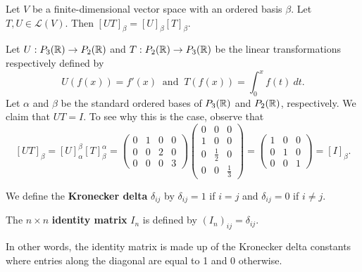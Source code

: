 \begin{corollary}
    Let \( V  \) be a finite-dimensional vector space with an ordered basis \( \beta  \). Let \( T,U \in \mathcal{L}(V) \). Then \( [UT]_{\beta}^{}  = [U]_{\beta}^{}  [T]_{\beta}^{}  \).
\end{corollary}

\begin{eg}
    Let \( U: {P}_{3}(\mathbb{R}) \to {P}_{2}(\mathbb{R}) \) and \( T: {P}_{2}(\mathbb{R}) \to {P}_{3}(\mathbb{R}) \) be the linear transformations respectively defined by
    \[ U(f(x)) = f'(x)  \ \text{ and } \ T(f(x)) = \int_{ 0 }^{ x } f(t) \ dt.  \]
    Let \( \alpha  \) and \( \beta  \) be the standard ordered bases of \( {P}_{3}(\mathbb{R}) \) and \( {P}_{2}(\mathbb{R}) \), respectively. We claim that \( UT = I \). To see why this is the case, observe that
    \[ [UT]_{\beta}^{}  = [U]_{\alpha}^{\beta}  [T]_{\beta}^{\alpha} = \begin{pmatrix}
        0 & 1 & 0 & 0 \\
        0 & 0 & 2 & 0 \\
        0 & 0 & 0 & 3
        \end{pmatrix} \begin{pmatrix}
            0 & 0 & 0 \\
            1 & 0 & 0 \\
            0 & \frac{ 1 }{ 2 } & 0 \\
            0 & 0 & \frac{ 1 }{ 3 }  
            \end{pmatrix}  = \begin{pmatrix}
            1 & 0 & 0 \\
            0 & 1 & 0 \\
            0 & 0 & 1 
    \end{pmatrix} = [I]_{\beta}^{}.  \]
\end{eg}


\begin{definition}
    We define the \textbf{Kronecker delta} \( {\delta}_{ij} \) by \( {\delta}_{ij} = 1  \) if \( i = j  \) and \( {\delta}_{ij} = 0  \) if \( i \neq j  \). 
\end{definition}

\begin{definition}
   The \( n \times n  \) \textbf{identity matrix} \( {I}_{n} \) is defined by \( {({I}_{n})}_{ij} = {\delta}_{ij} \). 
\end{definition}

In other words, the identity matrix is made up of the Kronecker delta constants where entries along the diagonal are equal to 1 and 0 otherwise.

